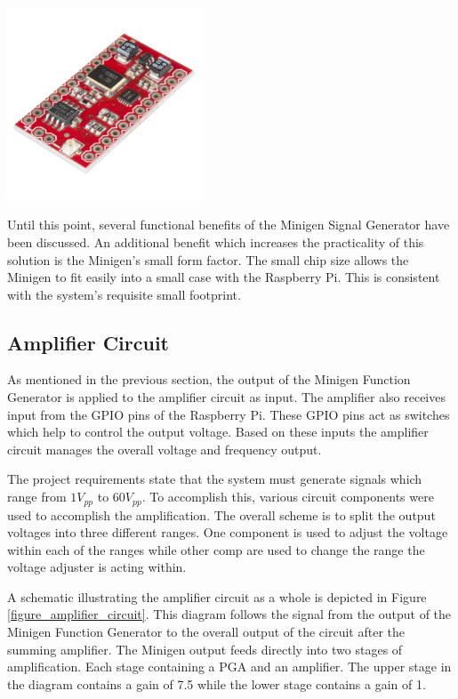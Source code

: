 \documentclass{article}	%
\begin{document}
\begin{multicols}{2}
\begin{center}
\includegraphics[width=0.43\textwidth,keepaspectratio]{minigen_real.png}
\end{center}

Until this point,
several functional benefits of the Minigen Signal Generator have been discussed.
An additional benefit which 
increases the practicality of this solution is the Minigen's small form factor.
The small chip size 
allows the Minigen to fit easily into a small case 
with the Raspberry Pi.
This is consistent with the system's requisite small footprint.

\subsection{Amplifier Circuit}
As mentioned in the previous section,
the output of the Minigen Function Generator
is applied to the amplifier circuit as input.
The amplifier also receives input from 
the GPIO pins of the Raspberry Pi.
These GPIO pins act as switches which help to control the output voltage.
Based on these inputs 
the amplifier circuit manages the overall 
voltage and frequency output.

The project requirements state that the system must 
generate signals which range from $1V_{pp}$ to $60V_{pp}$. 
To accomplish this,
various circuit components were used to accomplish the amplification.
The overall scheme is to split the output voltages into
three different ranges.
One component is used to adjust the voltage within each of the ranges while
other comp are used to change the range the voltage adjuster is acting within.

A schematic illustrating the amplifier circuit as a whole is 
depicted in Figure \ref{figure_amplifier_circuit}.
This diagram follows the signal from
the output of the Minigen Function Generator to
the overall output of the circuit after the summing amplifier.
The Minigen output feeds directly into two stages of amplification.
Each stage containing a PGA and an amplifier.
The upper stage in the diagram contains a gain of 7.5 while
the lower stage contains a gain of 1.


\end{multicols}
\end{document}
